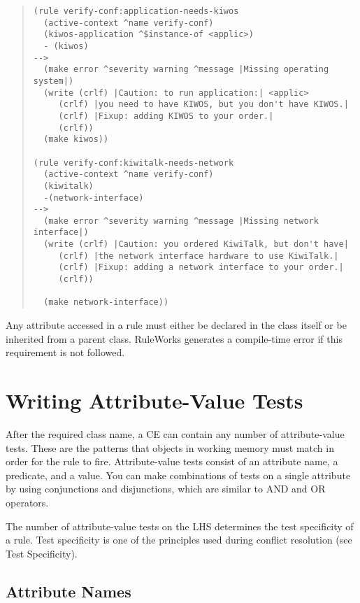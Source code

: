 \begin{quote}
\begin{verbatim}
(rule verify-conf:application-needs-kiwos
  (active-context ^name verify-conf)
  (kiwos-application ^$instance-of <applic>)
  - (kiwos)
-->
  (make error ^severity warning ^message |Missing operating system|)
  (write (crlf) |Caution: to run application:| <applic>
     (crlf) |you need to have KIWOS, but you don't have KIWOS.|
     (crlf) |Fixup: adding KIWOS to your order.|
     (crlf))
  (make kiwos))

(rule verify-conf:kiwitalk-needs-network
  (active-context ^name verify-conf)
  (kiwitalk)
  -(network-interface)
-->
  (make error ^severity warning ^message |Missing network interface|)
  (write (crlf) |Caution: you ordered KiwiTalk, but don't have|
     (crlf) |the network interface hardware to use KiwiTalk.|
     (crlf) |Fixup: adding a network interface to your order.|
     (crlf))

  (make network-interface))
\end{verbatim}
\end{quote}

\begin{note}
  Any attribute accessed in a rule must either be declared in the
  class itself or be inherited from a parent class. RuleWorks
  generates a compile-time error if this requirement is not followed.
\end{note}

\section{Writing Attribute-Value Tests}
\label{s:attributevalue}

After the required class name, a CE can contain any number of
attribute-value tests. These are the patterns that objects in working
memory must match in order for the rule to fire. Attribute-value tests
consist of an attribute name, a predicate, and a value. You can make
combinations of tests on a single attribute by using conjunctions and
disjunctions, which are similar to AND and OR operators.

The number of attribute-value tests on the LHS determines the test
specificity of a rule. Test specificity is one of the principles used
during conflict resolution (see Test Specificity).

\subsection{Attribute Names}

